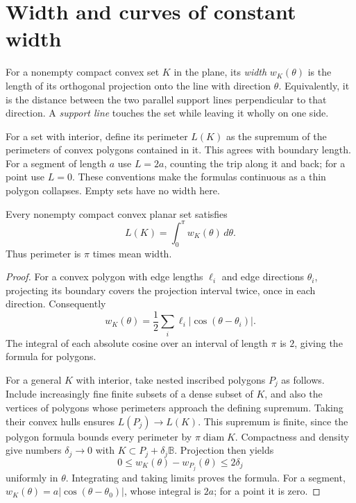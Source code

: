 \section{Width and curves of constant width}

For a nonempty compact convex set $K$ in the plane, its \emph{width} $w_K(\theta)$ is the length of its orthogonal projection onto the line with direction $\theta$. Equivalently, it is the distance between the two parallel support lines perpendicular to that direction. A \emph{support line} touches the set while leaving it wholly on one side.

For a set with interior, define its perimeter $L(K)$ as the supremum of the perimeters of convex polygons contained in it. This agrees with boundary length. For a segment of length $a$ use $L=2a$, counting the trip along it and back; for a point use $L=0$. These conventions make the formulas continuous as a thin polygon collapses. Empty sets have no width here.

\begin{theorem}\label{geometry:thm:cauchy}
Every nonempty compact convex planar set satisfies
\[
L(K)=\int_0^\pi w_K(\theta)\,d\theta.
\]
Thus perimeter is $\pi$ times mean width.
\end{theorem}

\begin{proof}
For a convex polygon with edge lengths $\ell_i$ and edge directions $\theta_i$, projecting its boundary covers the projection interval twice, once in each direction. Consequently
\[
w_K(\theta)=\frac12\sum_i\ell_i|\cos(\theta-\theta_i)|.
\]
The integral of each absolute cosine over an interval of length $\pi$ is $2$, giving the formula for polygons.

For a general $K$ with interior, take nested inscribed polygons $P_j$ as follows. Include increasingly fine finite subsets of a dense subset of $K$, and also the vertices of polygons whose perimeters approach the defining supremum. Taking their convex hulls ensures $L(P_j)\to L(K)$. This supremum is finite, since the polygon formula bounds every perimeter by $\pi\operatorname{diam}K$. Compactness and density give numbers $\delta_j\to0$ with $K\subset P_j+\delta_j\mathbb B$. Projection then yields
\[
0\le w_K(\theta)-w_{P_j}(\theta)\le2\delta_j
\]
uniformly in $\theta$. Integrating and taking limits proves the formula. For a segment, $w_K(\theta)=a|\cos(\theta-\theta_0)|$, whose integral is $2a$; for a point it is zero.
\end{proof}

